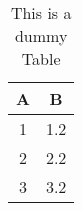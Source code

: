 \begin{table}[h!]
\centering
\begin{tabular}
{| c | c |}
\hline
 A & B \\ 
\hline
 1 & 1.2 \\ 
\hline
 2 & 2.2 \\ 
\hline
 3 & 3.2 \\ 
\hline
\end{tabular}
\label{DummyTable}
\caption{This is a dummy Table}
\end{table}
